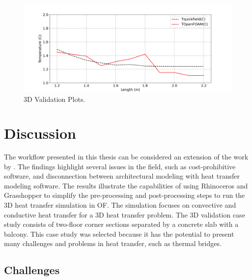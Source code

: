 \begin{figure}[htb] 
\centering
\includegraphics[width=1\columnwidth]{Figures/valpl2.png}
\hspace{0.7cm}
\caption{3D Validation Plots.}
\label{fig:validation-plots}
\end{figure}





\afterpage{\clearpage}
\section{Discussion}


The workflow presented in this thesis can be considered an extension of the work by \citeauthor{kastner2020solving} \cite{kastner2020solving}. 
The findings highlight several issues in the field, such as cost-prohibitive software, and disconnection between architectural modeling with heat transfer modeling software. 
The results illustrate the capabilities of using Rhinoceros and Grasshopper to simplify the pre-processing and post-processing steps to run the 3D heat transfer simulation in \gls{OF}. 
The simulation focuses on convective and conductive heat transfer for a 3D heat transfer problem. The 3D validation case study consists of two-floor corner sections separated by a concrete slab with a balcony. This case study was selected because it has the potential to present many challenges and problems in heat transfer, such as thermal bridges.


\subsection{Challenges}
